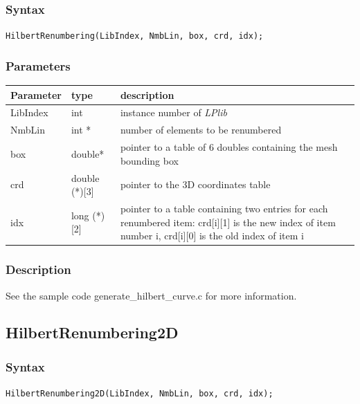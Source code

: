 \documentclass[a4paper,12pt]{article}
\begin{document}
\subsubsection*{Syntax}
\tt{HilbertRenumbering(LibIndex, NmbLin, box, crd, idx);}
\normalfont

\subsubsection*{Parameters}
\begin{tabular}{|m{2cm}|m{3cm}|m{8cm}|}
\hline
Parameter  & type   & description \\
\hline
LibIndex   & int    & instance number of \emph{LPlib} \\
\hline
NmbLin     & int * & number of elements to be renumbered \\
\hline
box        & double* & pointer to a table of 6 doubles containing the mesh bounding box \\
\hline
crd        & double (*)[3] & pointer to the 3D coordinates table \\
\hline
idx        & long (*)[2] & pointer to a table containing two entries for each renumbered item: crd[i][1] is the new index of item number i, crd[i][0] is the old index of item i \\
\hline
\end{tabular}

\subsubsection*{Description}
See the sample code generate\_hilbert\_curve.c for more information.


\subsection{HilbertRenumbering2D}

\subsubsection*{Syntax}
\tt{HilbertRenumbering2D(LibIndex, NmbLin, box, crd, idx);}
\normalfont
\end{document}
